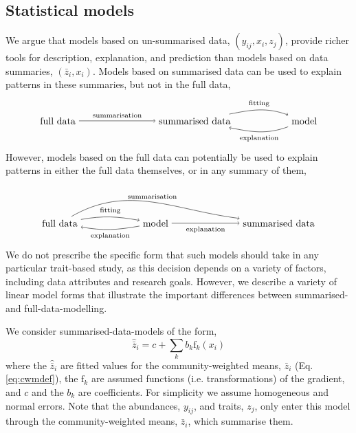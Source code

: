 \documentclass[12pt]{ecology}
\begin{document}
\subsection{Statistical models}

We argue that models based on un-summarised data, $(y_{ij}, x_i, z_j)$, provide richer tools for description, explanation, and prediction than models based on data summaries, $(\bar{z}_i, x_i)$.  Models based on  summarised data can be used to explain patterns in these summaries, but not in the full data,
\begin{equation}
\begin{tikzpicture}
  \node (full) at (0,0) {full data};
  \node (sum) at (5,0) {summarised data};
  \node (mod) at (9,0) {model};
  \draw[->] (full) to node [above]
    {\scriptsize summarisation} (sum);
  \draw[->] (sum) to [out = 11, in = 160] node [above]
    {\scriptsize fitting} (mod);
  \draw[->] (mod) to [out = -160, in = -11] node [below]
    {\scriptsize explanation} (sum);
\end{tikzpicture}
\end{equation}
However, models based on the full data can potentially be used to explain patterns in either the full data themselves, or in any summary of them,
\begin{equation}
\begin{tikzpicture}
  \node (full) at (0,0) {full data};
  \node (mod) at (3.5,0) {model};
  \node (sum) at (8,0) {summarised data};
  \draw[->] (full) to [out = 10, in = 170] node [above] 
    {\scriptsize fitting} (mod);
  \draw[->] (mod) to [out = -170, in = -10] node [below]
    {\scriptsize explanation} (full);
  \draw[->] (full) to [out = 30, in = 173] node [above]
    {\scriptsize summarisation} (sum);
  \draw[->] (mod) to node [below]
    {\scriptsize explanation} (sum);
\end{tikzpicture}
\end{equation}
We do not prescribe the specific form that such models should take in any particular trait-based study, as this decision depends on a variety of factors, including data attributes and research goals.  However, we describe a variety of linear model forms that illustrate the important differences between summarised- and full-data-modelling.

We consider summarised-data-models of the form,
\begin{equation}
\hat{\bar{z}}_i = c + \sum_k b_k \mathrm{f}_k (x_i)
\end{equation}
where the $\hat{\bar{z}}_i$ are fitted values for the community-weighted means, $\bar{z}_i$ (Eq. \ref{eq:cwmdef}), the $\mathrm{f}_k$ are assumed functions (i.e. transformations) of the gradient, and $c$ and the $b_k$ are coefficients.  For simplicity we assume homogeneous and normal errors.  Note that the abundances, $y_{ij}$, and traits, $z_j$, only enter this model through the community-weighted means, $\bar{z}_i$, which summarise them.
\end{document}
